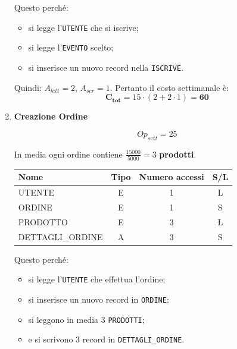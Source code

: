 \documentclass[a4paper,12pt]{report}
\begin{document}
\begin{enumerate}
	      Questo perché:
	      \begin{itemize}
		      \item si legge l'\texttt{UTENTE} che si iscrive;
		      \item si legge l'\texttt{EVENTO} scelto;
		      \item si inserisce un nuovo record nella \texttt{ISCRIVE}.
	      \end{itemize}

	      Quindi: $A_{lett}=2$, $A_{scr}=1$.
	      Pertanto il costo settimanale è:
	      $$\mathbf{C_{tot}} = 15 \cdot (2 + 2 \cdot 1) = \mathbf{60}$$


	\item {\large \textbf{Creazione Ordine}} \label{op11}

	      $$
		      {Op}_{sett} = 25
	      $$

	      In media ogni ordine contiene $\frac{15000}{5000}=3$ \textbf{prodotti}.

	      \begin{table}[H]
		      \centering
		      \small
		      \renewcommand{\arraystretch}{1.15}
		      \begin{tabularx}{0.9\textwidth}{|X|c|c|c|}
			      \hline
			      \rowcolor{gray!20}
			      \textbf{Nome}    & \textbf{Tipo} & \textbf{Numero accessi} & \textbf{S/L} \\
			      \hline
			      UTENTE           & E             & 1                       & L            \\
			      ORDINE           & E             & 1                       & S            \\
			      PRODOTTO         & E             & 3                       & L            \\
			      DETTAGLI\_ORDINE & A             & 3                       & S            \\
			      \hline
		      \end{tabularx}
	      \end{table}

	      Questo perché:
	      \begin{itemize}
		      \item si legge l'\texttt{UTENTE} che effettua l'ordine;
		      \item si inserisce un nuovo record in \texttt{ORDINE};
		      \item si leggono in media 3 \texttt{PRODOTTI};
		      \item e si scrivono 3 record in \texttt{DETTAGLI\_ORDINE}.
	      \end{itemize}


\end{enumerate}
\end{document}
